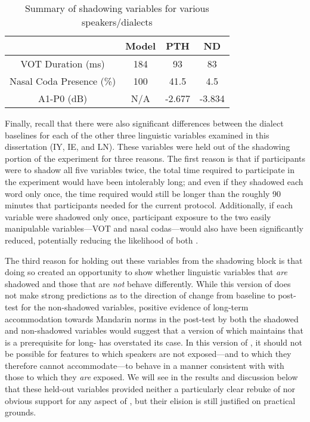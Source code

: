 \begin{table}[]
    \centering
    \begin{tabular}{|c|c c c|}
        \hline
                                 & Model & PTH    & ND \\
        \hline
        VOT Duration (ms)        & 184   & 93     & 83 \\
        Nasal Coda Presence (\%) & 100   & 41.5   & 4.5 \\
        A1-P0 (dB)               & N/A   & -2.677 & -3.834 \\
        \hline
    \end{tabular}
    \caption{Summary of shadowing variables for various speakers/dialects}
    \label{tab:shadVarbSumm}
\end{table}

    Finally, recall that there were also significant differences between the dialect baselines for each of the other three linguistic variables examined in this dissertation (IY, IE, and LN). These variables were held out of the shadowing portion of the experiment for three reasons. The first reason is that if participants were to shadow all five variables twice, the total time required to participate in the experiment would have been intolerably long; and even if they shadowed each word only once, the time required would still be longer than the roughly 90 minutes that participants needed for the current protocol. Additionally, if each variable were shadowed only once, participant exposure to the two easily manipulable variables---VOT and nasal codas---would also have been significantly reduced, potentially reducing the likelihood of both \sla{}.
    
    The third reason for holding out these variables from the shadowing block is that doing so created an opportunity to show whether linguistic variables that \emph{are} shadowed and those that are \emph{not} behave differently. While this version of \cbat{} does not make strong predictions as to the direction of change from baseline to post-test for the non-shadowed variables, positive evidence of long-term accommodation towards Mandarin norms in the \ND{} post-test by both the shadowed and non-shadowed variables would suggest that a version of \cbat{} which maintains that \sta{} is a prerequisite for long- has overstated its case. In this version of \cbat{}, it should not be possible for features to which speakers are not exposed---and to which they therefore cannot accommodate---to behave in a manner consistent with with those to which they \emph{are} exposed. We will see in the results and discussion below that these held-out variables provided neither a particularly clear rebuke of nor obvious support for any aspect of \cbat{}, but their elision is still justified on practical grounds.
    
